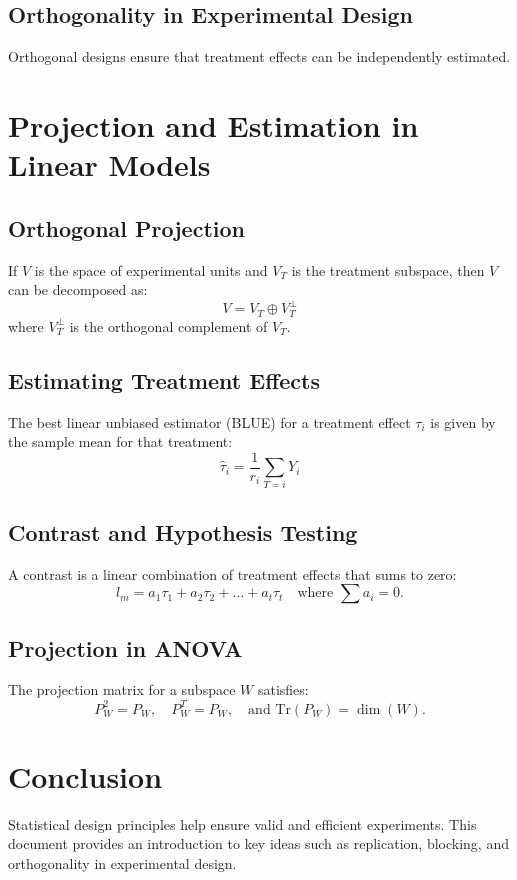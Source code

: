 \documentclass{tufte-handout}
\begin{document}
\subsection{Orthogonality in Experimental Design}
Orthogonal designs ensure that treatment effects can be independently estimated.


\section{Projection and Estimation in Linear Models}

\subsection{Orthogonal Projection}
If $V$ is the space of experimental units and $V_T$ is the treatment subspace, then $V$ can be decomposed as:
\[ V = V_T \oplus V_T^\perp \]
where $V_T^\perp$ is the orthogonal complement of $V_T$.

\subsection{Estimating Treatment Effects}
The best linear unbiased estimator (BLUE) for a treatment effect $\tau_i$ is given by the sample mean for that treatment:
\[ \hat{\tau}_i = \frac{1}{r_i} \sum_{T=i} Y_i \]

\subsection{Contrast and Hypothesis Testing}
A contrast is a linear combination of treatment effects that sums to zero:
\[ l_m = a_1 \tau_1 + a_2 \tau_2 + \dots + a_t \tau_t \quad \text{where } \sum a_i = 0. \]

\subsection{Projection in ANOVA}
The projection matrix for a subspace $W$ satisfies:
\[ P_W^2 = P_W, \quad P_W^T = P_W, \quad \text{and } \text{Tr}(P_W) = \dim(W). \]

\section{Conclusion}
Statistical design principles help ensure valid and efficient experiments. This document provides an introduction to key ideas such as replication, blocking, and orthogonality in experimental design.
\end{document}
